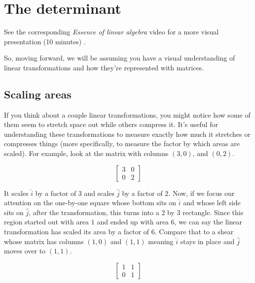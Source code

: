 \section{The determinant}

\begin{remark}
  See the corresponding \textit{Essence of linear algebra} video for a more
  visual presentation (10 minutes) \cite{bib:linalg_the_determinant}.
\end{remark}

So, moving forward, we will be assuming you have a visual understanding of
linear transformations and how they're represented with matrices.

\subsection{Scaling areas}

If you think about a couple linear transformations, you might notice how some of
them seem to stretch space out while others compress it. It's useful for
understanding these transformations to measure exactly how much it stretches or
compresses things (more specifically, to measure the factor by which areas are
scaled). For example, look at the matrix with columns $(3, 0)$, and $(0, 2)$.

\begin{equation*}
  \begin{bmatrix}
    3 & 0 \\
    0 & 2
  \end{bmatrix}
\end{equation*}

It scales $\hat{i}$ by a factor of $3$ and scales $\hat{j}$ by a factor of $2$.
Now, if we focus our attention on the one-by-one square whose bottom sits on
$\hat{i}$ and whose left side sits on $\hat{j}$, after the transformation, this
turns into a $2$ by $3$ rectangle. Since this region started out with area $1$
and ended up with area $6$, we can say the linear transformation has scaled its
area by a factor of $6$. Compare that to a shear whose matrix has columns
$(1, 0)$ and $(1, 1)$ meaning $\hat{i}$ stays in place and $\hat{j}$ moves over
to $(1, 1)$.

\begin{equation*}
  \begin{bmatrix}
    1 & 1 \\
    0 & 1
  \end{bmatrix}
\end{equation*}

